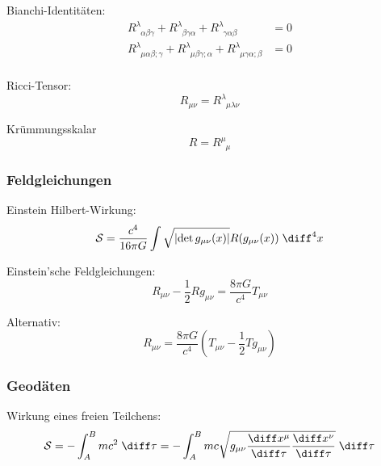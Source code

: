 \documentclass[11pt]{article}
\numberwithin{equation}{section}
\begin{document}
          Bianchi-Identitäten:
          \begin{equation}
            \begin{aligned}
              R^{\lambda}_{\phantom{\lambda}\alpha\beta\gamma} + R^{\lambda}_{\phantom{\lambda}\beta\gamma\alpha} + R^{\lambda}_{\phantom{\lambda}\gamma\alpha\beta} &= 0 \\
              R^{\lambda}_{\phantom{\lambda}\mu\alpha\beta;\gamma} + R^{\lambda}_{\phantom{\lambda}\mu\beta\gamma;\alpha} + R^{\lambda}_{\phantom{\lambda}\mu\gamma\alpha;\beta} &= 0 \\
            \end{aligned}
          \end{equation}

          Ricci-Tensor:
          \begin{equation}
            R_{\mu\nu} = R^\lambda_{\phantom{\lambda}\mu\lambda\nu}
          \end{equation}

          Krümmungsskalar
          \begin{equation}
            R = R^\mu_{\phantom{\mu}\mu}
          \end{equation}

        \subsubsection{Feldgleichungen}
          Einstein Hilbert-Wirkung:
          \begin{equation}
            \mathcal{S} = \frac{c^4}{16\pi G} \int \sqrt{\left|\det{g_{\mu\nu}(x)}\right|} R(g_{\mu\nu}(x))\;\diff^4 x
          \end{equation}

          Einstein'sche Feldgleichungen:
          \begin{equation}
            R_{\mu\nu} - \frac{1}{2} R g_{\mu\nu} = \frac{8\pi G}{c^4} T_{\mu\nu}
          \end{equation}

          Alternativ:
          \begin{equation}
            R_{\mu\nu} = \frac{8\pi G}{c^4} \left( T_{\mu\nu} - \frac{1}{2} T g_{\mu\nu} \right)
          \end{equation}


        \subsubsection{Geodäten}
          Wirkung eines freien Teilchens:
          \begin{equation}
            \mathcal{S} = -\int_A^B mc^2\;\diff \tau = -\int_A^B mc\sqrt{g_{\mu\nu} \tder{x^\mu}{\tau} \tder{x^\nu}{\tau}} \;\diff \tau
          \end{equation}
\end{document}
